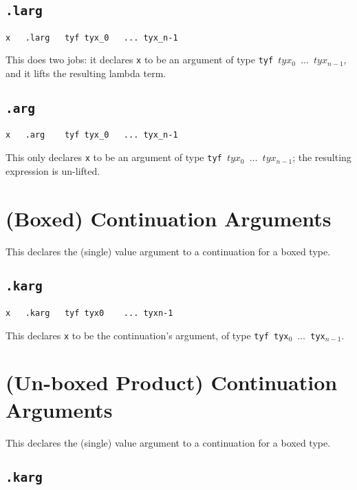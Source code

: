 \documentclass{report}
\newcommand\stringcode[1]{\texttt{#1}}
\begin{document}
\subsection{\stringcode{.larg}}

\begin{verbatim}
x	.larg	tyf	tyx_0	...	tyx_n-1
\end{verbatim}

This does two jobs:
it declares \stringcode{x} to be an argument of type \stringcode{tyf $tyx_0$ $\ldots$ $tyx_{n-1}$},
and it lifts the resulting lambda term.

\subsection{\stringcode{.arg}}

\begin{verbatim}
x	.arg	tyf	tyx_0	...	tyx_n-1
\end{verbatim}

This only declares \stringcode{x} to be an argument of type \stringcode{tyf $tyx_0$ $\ldots$ $tyx_{n-1}$};
the resulting expression is un-lifted.

\section{(Boxed) Continuation Arguments}
\label{cont_arg}

This declares the (single) value argument to a continuation for a boxed type.

\subsection{\stringcode{.karg}}

\begin{verbatim}
x	.karg	tyf	tyx0	...	tyxn-1
\end{verbatim}

This declares \stringcode{x} to be the continuation's argument, of type \stringcode{tyf tyx$_0$ $\ldots$ tyx$_{n-1}$}.

\section{(Un-boxed Product) Continuation Arguments}
\label{field_cont_arg}

This declares the (single) value argument to a continuation for a boxed type.

\subsection{\stringcode{.karg}}
\end{document}
